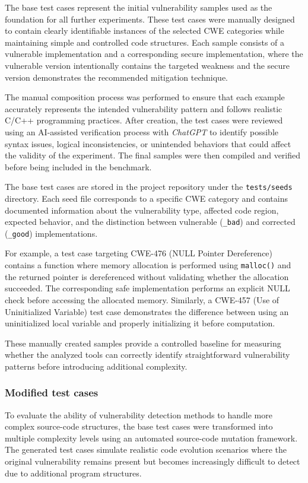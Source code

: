 \documentclass[11pt,a4paper]{article}
\begin{document}
The base test cases represent the initial vulnerability samples used as the foundation for all further experiments. These test cases were manually designed to contain clearly identifiable instances of the selected CWE categories while maintaining simple and controlled code structures. Each sample consists of a vulnerable implementation and a corresponding secure implementation, where the vulnerable version intentionally contains the targeted weakness and the secure version demonstrates the recommended mitigation technique.

The manual composition process was performed to ensure that each example accurately represents the intended vulnerability pattern and follows realistic C/C++ programming practices. After creation, the test cases were reviewed using an AI-assisted verification process with \textit{ChatGPT} to identify possible syntax issues, logical inconsistencies, or unintended behaviors that could affect the validity of the experiment. The final samples were then compiled and verified before being included in the benchmark.

The base test cases are stored in the project repository under the \texttt{tests/seeds} directory. Each seed file corresponds to a specific CWE category and contains documented information about the vulnerability type, affected code region, expected behavior, and the distinction between vulnerable (\texttt{\_bad}) and corrected (\texttt{\_good}) implementations.

For example, a test case targeting CWE-476 (NULL Pointer Dereference) contains a function where memory allocation is performed using \texttt{malloc()} and the returned pointer is dereferenced without validating whether the allocation succeeded. The corresponding safe implementation performs an explicit NULL check before accessing the allocated memory. Similarly, a CWE-457 (Use of Uninitialized Variable) test case demonstrates the difference between using an uninitialized local variable and properly initializing it before computation.

These manually created samples provide a controlled baseline for measuring whether the analyzed tools can correctly identify straightforward vulnerability patterns before introducing additional complexity.


\subsubsection{Modified test cases}

To evaluate the ability of vulnerability detection methods to handle more complex source-code structures, the base test cases were transformed into multiple complexity levels using an automated source-code mutation framework. The generated test cases simulate realistic code evolution scenarios where the original vulnerability remains present but becomes increasingly difficult to detect due to additional program structures.
\end{document}
